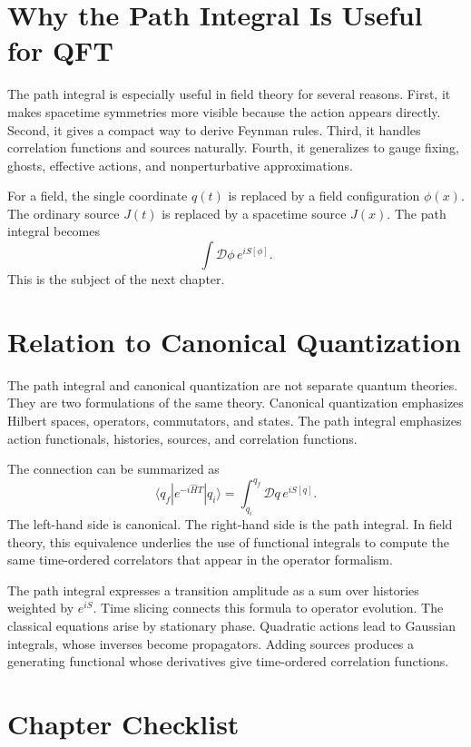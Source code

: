 \section{Why the Path Integral Is Useful for QFT}

The path integral is especially useful in field theory for several reasons.
First, it makes spacetime symmetries more visible because the action appears
directly. Second, it gives a compact way to derive Feynman rules. Third, it
handles correlation functions and sources naturally. Fourth, it generalizes to
gauge fixing, ghosts, effective actions, and nonperturbative approximations.

For a field, the single coordinate \(q(t)\) is replaced by a field configuration
\(\phi(x)\). The ordinary source \(J(t)\) is replaced by a spacetime source
\(J(x)\). The path integral becomes
\[
    \int\mathcal{D}\phi\,e^{iS[\phi]}.
\]
This is the subject of the next chapter.

\section{Relation to Canonical Quantization}

The path integral and canonical quantization are not separate quantum theories.
They are two formulations of the same theory. Canonical quantization emphasizes
Hilbert spaces, operators, commutators, and states. The path integral emphasizes
action functionals, histories, sources, and correlation functions.

The connection can be summarized as
\[
    \langle q_f|e^{-i\hat H T}|q_i\rangle
    = \int_{q_i}^{q_f}\mathcal{D}q\,e^{iS[q]}.
\]
The left-hand side is canonical. The right-hand side is the path integral. In
field theory, this equivalence underlies the use of functional integrals to
compute the same time-ordered correlators that appear in the operator formalism.

\begin{summarybox}
The path integral expresses a transition amplitude as a sum over histories
weighted by \(e^{iS}\). Time slicing connects this formula to operator evolution.
The classical equations arise by stationary phase. Quadratic actions lead to
Gaussian integrals, whose inverses become propagators. Adding sources produces a
generating functional whose derivatives give time-ordered correlation functions.
\end{summarybox}

\section{Chapter Checklist}

